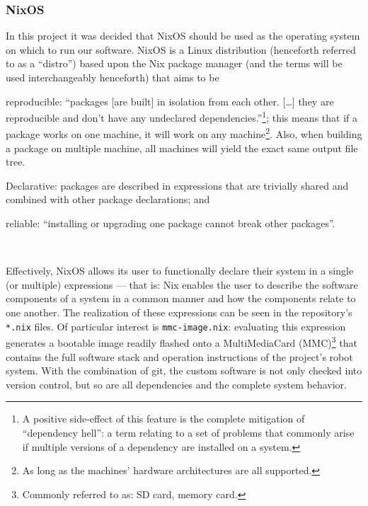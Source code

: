 \subsubsection{NixOS}
In this project it was decided that NixOS should be used as the operating system on which to run our software.
NixOS is a Linux distribution (henceforth referred to as a ``distro'') based upon the Nix package manager (and the terms will be used interchangeably henceforth) that aims to be
\begin{inline-enum}
\item reproducible:
  ``packages [are built] in isolation from each other. [\ldots] they are reproducible and don't have any undeclared dependencies.''\footnote{A positive side-effect of this feature is the complete mitigation of ``dependency hell'': a term relating to a set of problems that commonly arise if multiple versions of a dependency are installed on a system.};
  this means that if a package works on one machine, it will work on any machine\footnote{As long as the machines' hardware architectures are all supported.}.
  Also, when building a package on multiple machine, all machines will yield the exact same output file tree.
\item Declarative:
  packages are described in expressions that are trivially shared and combined with other package declarations; and
\item reliable:
  ``installing or upgrading one package cannot break other packages''.
\end{inline-enum}~\parencite{nixos.org}

Effectively, NixOS allows its user to functionally declare their system in a single (or multiple) expressions ---
that is: Nix enables the user to describe the software components of a system in a common manner and how the components relate to one another.
The realization of these expressions can be seen in the repository's \texttt{*.nix} files.
Of particular interest is \texttt{mmc-image.nix}: evaluating this expression generates a bootable image readily flashed onto a MultiMediaCard (MMC)\footnote{Commonly referred to as: SD card, memory card.} that contains the full software stack and operation instructions of the project's robot system.
With the combination of git, the custom software is not only checked into version control, but so are all dependencies and the complete system behavior.

